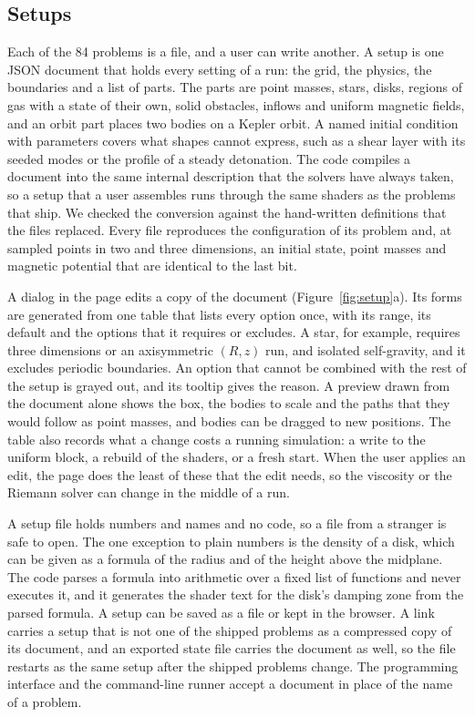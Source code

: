 \documentclass[twocolumn]{aastex701}
\begin{document}
\subsection{Setups}
\label{sec:setups}

Each of the 84 problems is a file, and a user can write another. A setup is one JSON document that holds every setting of a run: the grid, the physics, the boundaries and a list of parts. The parts are point masses, stars, disks, regions of gas with a state of their own, solid obstacles, inflows and uniform magnetic fields, and an orbit part places two bodies on a Kepler orbit. A named initial condition with parameters covers what shapes cannot express, such as a shear layer with its seeded modes or the profile of a steady detonation. The code compiles a document into the same internal description that the solvers have always taken, so a setup that a user assembles runs through the same shaders as the problems that ship. We checked the conversion against the hand-written definitions that the files replaced. Every file reproduces the configuration of its problem and, at sampled points in two and three dimensions, an initial state, point masses and magnetic potential that are identical to the last bit.

A dialog in the page edits a copy of the document (Figure~\ref{fig:setup}a). Its forms are generated from one table that lists every option once, with its range, its default and the options that it requires or excludes. A star, for example, requires three dimensions or an axisymmetric $(R, z)$ run, and isolated self-gravity, and it excludes periodic boundaries. An option that cannot be combined with the rest of the setup is grayed out, and its tooltip gives the reason. A preview drawn from the document alone shows the box, the bodies to scale and the paths that they would follow as point masses, and bodies can be dragged to new positions. The table also records what a change costs a running simulation: a write to the uniform block, a rebuild of the shaders, or a fresh start. When the user applies an edit, the page does the least of these that the edit needs, so the viscosity or the Riemann solver can change in the middle of a run.

A setup file holds numbers and names and no code, so a file from a stranger is safe to open. The one exception to plain numbers is the density of a disk, which can be given as a formula of the radius and of the height above the midplane. The code parses a formula into arithmetic over a fixed list of functions and never executes it, and it generates the shader text for the disk's damping zone from the parsed formula. A setup can be saved as a file or kept in the browser. A link carries a setup that is not one of the shipped problems as a compressed copy of its document, and an exported state file carries the document as well, so the file restarts as the same setup after the shipped problems change. The programming interface and the command-line runner accept a document in place of the name of a problem.
\end{document}

